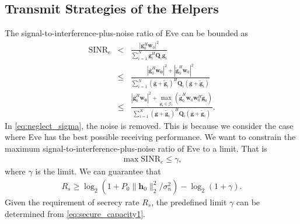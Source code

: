 \documentclass[journal]{IEEEtran}
\begin{document}
\subsection{Transmit Strategies of the Helpers}
The signal-to-interference-plus-noise ratio of Eve can be bounded as
\begin{eqnarray}
\mathrm{SINR}_e & < & \frac{\left| \mathbf{g}_{0}^H\mathbf{w}_{0}\right|^2}{\sum_{i=1}^{N}\mathbf{g}_{i}^H\mathbf{Q}_{i}\mathbf{g}_i} \label{eq:neglect_sigma}\\
&\leq & \frac{\left|\bar{\mathbf{g}}_0^H\mathbf{w_0}\right|^2 + \left|\tilde{\mathbf{g}}_0^H\mathbf{w}_0\right|^2}{\sum_{i = 1}^N(\bar{\mathbf{g}}+\tilde{\mathbf{g}}_i)^H\mathbf{Q}_i(\bar{\mathbf{g}}+\tilde{\mathbf{g}}_i)}\\
& \leq & \frac{\left|\bar{\mathbf{g}}_0^H\mathbf{w_0}\right|^2 + \max_{\tilde{\mathbf{g}}_i \in \mathcal{G}_i}(\tilde{\mathbf{g}}_0^H\mathbf{w}_0\mathbf{w}_0^H\tilde{\mathbf{g}}_0)}{\sum_{i = 1}^N(\bar{\mathbf{g}}+\tilde{\mathbf{g}}_i)^H\mathbf{Q}_i(\bar{\mathbf{g}}+\tilde{\mathbf{g}}_i)} .
\label{eq:SINR_e}
\end{eqnarray}
In \eqref{eq:neglect_sigma}, the noise is removed. This is because we consider the case where Eve has the best possible receiving performance. 
We want to constrain the maximum signal-to-interference-plus-noise ratio of Eve to a limit. That is 
\begin{eqnarray}
\max \mathrm{SINR}_e \leq \gamma \label{eq:SINR_constraint},
\end{eqnarray} 
where $\gamma$ is the limit. We can guarantee that
\begin{eqnarray}
R_s \geq \log_2\left(1 + P_0\|\mathbf{h}_0\|_2^2/\sigma_n^2\right) - \log_2\left(1 + \gamma\right). \label{eq:secure_capacity1}
\end{eqnarray}
Given the requirement of secrecy rate $R_s$, the predefined limit $\gamma$ can be determined from \eqref{eq:secure_capacity1}.
\end{document}
